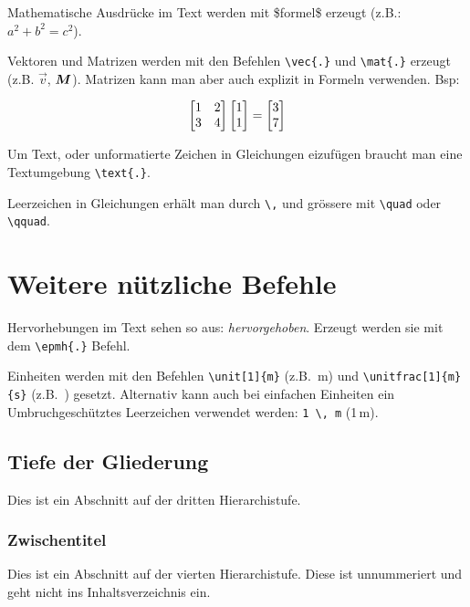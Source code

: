 Mathematische Ausdrücke im Text werden mit \$formel\$ erzeugt (z.B.:
$a^2+b^2=c^2$).

Vektoren und Matrizen werden mit den Befehlen \texttt{\textbackslash vec\{.\}} und \texttt{\textbackslash mat\{.\}} erzeugt (z.B. $\vec{v}$, $\mat{M}$). Matrizen kann man aber auch explizit in Formeln verwenden. Bsp:

\begin{equation}
    \begin{bmatrix}
    1 & 2 \\
    3 & 4 
    \end{bmatrix}
    \begin{bmatrix}
    1 \\
    1
    \end{bmatrix}
    = 
    \begin{bmatrix}
    3 \\
    7
    \end{bmatrix}
    \vspace{0.5cm}
\end{equation}

Um Text, oder unformatierte Zeichen in Gleichungen eizufügen braucht man eine Textumgebung \texttt{\textbackslash text\{.\}}.

Leerzeichen in Gleichungen erhält man durch \texttt{\textbackslash,} und grössere mit
\texttt{\textbackslash quad} oder \texttt{\textbackslash qquad}.


\section{Weitere nützliche Befehle}\label{sec:div}

Hervorhebungen im Text sehen so aus: \emph{hervorgehoben}. Erzeugt
werden sie mit dem \texttt{\textbackslash epmh\{.\}} Befehl.

Einheiten werden mit den Befehlen \texttt{\textbackslash unit[1]\{m\}} (z.B.~\unit[1]{m}) und \texttt{\textbackslash unitfrac[1]\{m\}\{s\}} (z.B.~) gesetzt. Alternativ kann auch bei einfachen Einheiten ein Umbruchgeschütztes Leerzeichen verwendet werden: \texttt{1 \textbackslash , m} (1\,m).

\subsection{Tiefe der Gliederung}
Dies ist ein Abschnitt auf der dritten Hierarchistufe.

\subsubsection{Zwischentitel}
Dies ist ein Abschnitt auf der vierten Hierarchistufe. Diese ist unnummeriert und geht nicht ins Inhaltsverzeichnis ein.